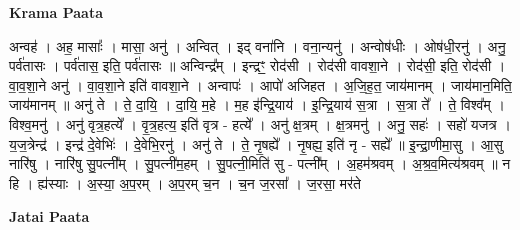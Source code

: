 \documentclass[17pt]{extarticle}
\begin{document}
\textbf{Krama Paata} \newline

अन्वह॑ । अह॒ मासाः᳚ । मासा॒ अनु॑ । अन्वित् । इद् वना॑नि । वना॒न्यनु॑ । अन्वोष॑धीः । ओष॑धी॒रनु॑ । अनु॒ पर्व॑तासः । पर्व॑तास॒ इति॒ पर्व॑तासः ॥ अन्विन्द्र᳚म् । इन्द्रꣳ॒॒ रोद॑सी । रोद॑सी वावशा॒ने । रोद॑सी॒ इति॒ रोद॑सी । वा॒व॒शा॒ने अनु॑ । वा॒व॒शा॒ने इति॑ वावशा॒ने । अन्वापः॑ । आपो॑ अजिहत । अ॒जि॒ह॒त॒ जाय॑मानम् । जाय॑मान॒मिति॒ जाय॑मानम् ॥ अनु॑ ते । ते॒ दा॒यि॒ । दा॒यि॒ म॒हे । म॒ह इ॑न्द्रि॒याय॑ । इ॒न्द्रि॒याय॑ स॒त्रा । स॒त्रा ते᳚ । ते॒ विश्व᳚म् । विश्व॒मनु॑ । अनु॑ वृत्र॒हत्ये᳚ । वृ॒त्र॒हत्य॒ इति॑ वृत्र - हत्ये᳚ । अनु॑ क्ष॒त्रम् । क्ष॒त्रमनु॑ । अनु॒ सहः॑ । सहो॑ यजत्र । य॒ज॒त्रेन्द्र॑ । इन्द्र॑ दे॒वेभिः॑ । दे॒वेभि॒रनु॑ । अनु॑ ते । ते॒ नृ॒षह्ये᳚ । नृ॒षह्य॒ इति॑ नृ - सह्ये᳚ ॥ इ॒न्द्रा॒णीमा॒सु । आ॒सु नारि॑षु । नारि॑षु सु॒पत्नी᳚म् । सु॒पत्नी॑म॒हम् । सु॒पत्नी॒मिति॑ सु - पत्नी᳚म् । अ॒हम॑श्रवम् । अ॒श्र॒व॒मित्य॑श्रवम् ॥ न हि । ह्य॑स्याः । अ॒स्या॒ अ॒प॒रम् । अ॒प॒रम् च॒न । च॒न ज॒रसा᳚ । ज॒रसा॒ मर॑ते \newline

\textbf{Jatai Paata} \newline
\end{document}
